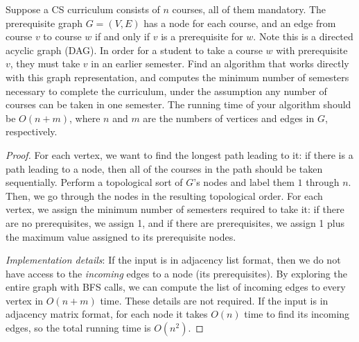   \begin{exercise}[DPV 3.16]
    Suppose a CS curriculum consists of $n$ courses, all of them mandatory. The prerequisite graph $G = (V,E)$ has a node for each course, and an edge from course $v$ to course $w$ if and only if $v$ is a prerequisite for $w$. Note this is a directed acyclic graph (DAG). In order for a student to take a course $w$ with prerequisite $v$, they must take $v$ in an earlier semester. Find an algorithm that works directly with this graph representation, and computes the minimum number of semesters necessary to complete the curriculum, under the assumption any number of courses can be taken in one semester. The running time of your algorithm should be $O(n+m)$, where $n$ and $m$ are the numbers of vertices and edges in $G$, respectively.
  \end{exercise}
  \begin{proof}
    For each vertex, we want to find the longest path leading to it: if there is a path leading to a node, then all of the courses in the path should be taken sequentially. Perform a topological sort of $G$'s nodes and label them $1$ through $n$. Then, we go through the nodes in the resulting topological order. For each vertex, we assign the minimum number of semesters required to take it: if there are no prerequisites, we assign 1, and if there are prerequisites, we assign 1 plus the maximum value assigned to its prerequisite nodes.
    
    \textit{Implementation details}: If the input is in adjacency list format, then we do not have access to the \emph{incoming} edges to a node (its prerequisites). By exploring the entire graph with BFS calls, we can compute the list of incoming edges to every vertex in $O(n+m)$ time. These details are not required. If the input is in adjacency matrix format, for each node it takes $O(n)$ time to find its incoming edges, so the total running time is $O(n^2)$.
  \end{proof}

